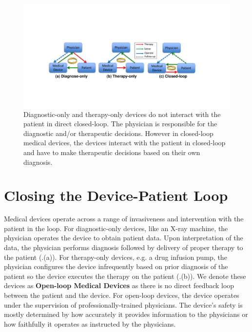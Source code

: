 \begin{figure}[t]
		\centering
		\includegraphics[width=\textwidth]{figs/closed-loop.pdf}
		\caption{\small Diagnostic-only and therapy-only devices do not interact with the patient in direct closed-loop. The physician is responsible for the diagnostic and/or therapeutic decisions. However in closed-loop medical devices, the devices interact with the patient in closed-loop and have to make therapeutic decisions based on their own diagnosis.}
		\label{fig:closed-loop}
\end{figure}
\section{Closing the Device-Patient Loop}
Medical devices operate across a range of invasiveness and intervention with the patient in the loop. For diagnostic-only devices, like an X-ray machine, the physician operates the device to obtain patient data. Upon interpretation of the data, the physician performs diagnosis followed by delivery of proper therapy to the patient (.(a)). For therapy-only devices, e.g. a drug infusion pump, the physician configures the device infrequently based on prior diagnosis of the patient so the device executes the therapy on the patient (.(b)). We denote these devices as \textbf{Open-loop Medical Devices} as there is no direct feedback loop between the patient and the device. For open-loop devices, the device operates under the supervision of professionally-trained physicians. The device's safety is mostly determined by how accurately it provides information to the physicians or how faithfully it operates as instructed by the physicians.

